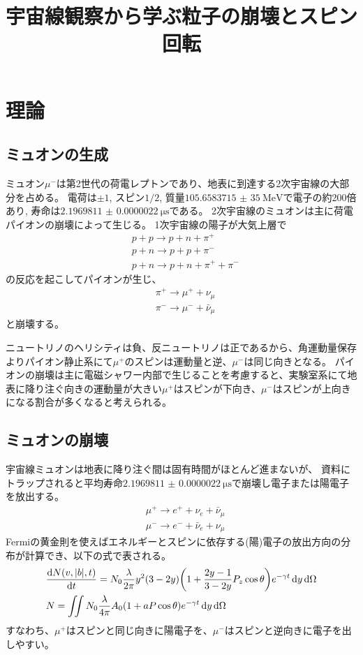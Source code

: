 \documentclass[dvipdfmx]{jsarticle}
\title{宇宙線観察から学ぶ粒子の崩壊とスピン回転
}
\begin{document}
\maketitle

\section{理論}
\subsection{ミュオンの生成}
\label{sec: theory: generation of muon}

ミュオン$\mu^-$は第2世代の荷電レプトンであり、地表に到達する2次宇宙線の大部分を占める。
電荷は$\pm1$, スピン$1/2$, 質量$\SI[]{105.658 3715(35)}[]{\MeV}$で電子の約200倍あり, 寿命は$\SI{2.1969811(22)}{\micro\second}$である。
2次宇宙線のミュオンは主に荷電パイオンの崩壊によって生じる。
1次宇宙線の陽子が大気上層で
\begin{align*}
    &p+p\to p+n+\pi^+
    \\
    &p+n\to p+p+\pi^-
    \\
    &p+n\to p+n+\pi^++\pi^-
\end{align*}
の反応を起こしてパイオンが生じ、
\begin{align*}
    &\pi^+\to\mu^++\nu_\mu
    \\
    &\pi^-\to\mu^-+\bar{\nu}_\mu
\end{align*}
と崩壊する。

ニュートリノのヘリシティは負、反ニュートリノは正であるから、角運動量保存よりパイオン静止系にて$\mu^+$のスピンは運動量と逆、$\mu^-$は同じ向きとなる。
パイオンの崩壊は主に電磁シャワー内部で生じることを考慮すると、実験室系にて地表に降り注ぐ向きの運動量が大きい$\mu^+$はスピンが下向き、$\mu^-$はスピンが上向きになる割合が多くなると考えられる。


\subsection{ミュオンの崩壊}
\label{sec: theory: decay of muon}

宇宙線ミュオンは地表に降り注ぐ間は固有時間がほとんど進まないが、
資料にトラップされると平均寿命$\SI{2.1969811(22)}{\micro\second}$で崩壊し電子または陽電子を放出する。
\begin{align*}
    &\mu^+\to e^++\nu_e+\bar{\nu}_\mu
    \\
    &\mu^-\to e^-+\bar{\nu}_e+\nu_\mu
\end{align*}
Fermiの黄金則を使えばエネルギーとスピンに依存する(陽)電子の放出方向の分布が計算でき、以下の式で表される。
\begin{align*}
    &\dv{N(v,|b|,t)}{t}
    =
    N_0\frac{\lambda}{2\pi}y^2(3-2y)
    \qty(
        1+\frac{2y-1}{3-2y}P_z\cos\theta
    )
    e^{-\gamma t}\dd{y}\dd{\Omega}
    \\
    &N=
    \iint N_0\frac{\lambda}{4\pi}
    A_0(1+aP\cos\theta)e^{-\gamma t}
    \dd{y}\dd{\Omega}
\end{align*}
すなわち、$\mu^+$はスピンと同じ向きに陽電子を、$\mu^-$はスピンと逆向きに電子を出しやすい。
\end{document}
